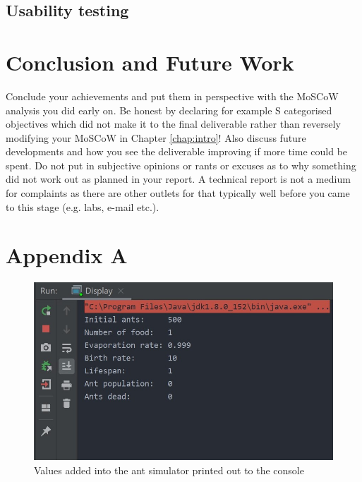 \documentclass[a4paper, oneside, 11pt]{report}
\begin{document}
\section{Usability testing}

\chapter{Conclusion and Future Work}
\label{chap:conclusion}
Conclude your achievements and put them in perspective with the MoSCoW analysis you did early on. Be honest by declaring for example S categorised objectives which did not make it to the final deliverable rather than reversely modifying your MoSCoW in Chapter \ref{chap:intro}! Also discuss future developments and how you see the deliverable improving if more time could be spent. Do not put in subjective opinions or rants or excuses as to why something did not work out as planned in your report. A technical report is not a medium for complaints as there are other outlets for that typically well before you came to this stage (e.g. labs, e-mail etc.).





\chapter*{Appendix A}
\begin{figure}[htb]
	\begin{center}
		\includegraphics[width=0.6 \columnwidth]{Ant_Simulator_Values.jpg}
		\caption{Values added into the ant simulator printed out to the console}
		\label{fig:Ant_Simulator_Values}
	\end{center}
\end{figure}
\end{document}
